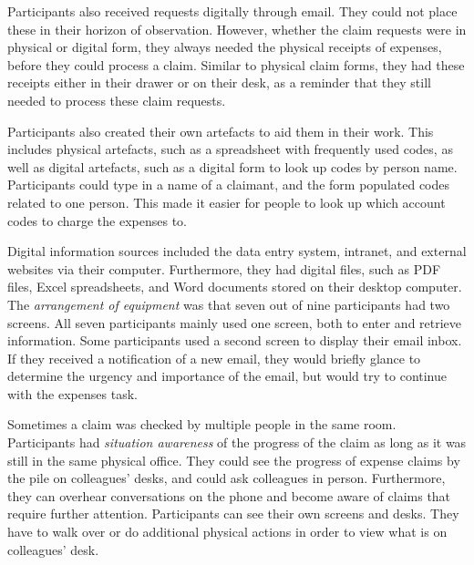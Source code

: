 Participants also received requests digitally through email. They could not place these in their horizon of observation. However, whether the claim requests were in physical or digital form, they always needed the physical receipts of expenses, before they could process a claim. Similar to physical claim forms, they had these receipts either in their drawer or on their desk, as a reminder that they still needed to process these claim requests.

Participants also created their own artefacts to aid them in their work. This includes physical artefacts, such as a spreadsheet with frequently used codes, as well as digital artefacts, such as a digital form to look up codes by person name. Participants could type in a name of a claimant, and the form populated codes related to one person. This made it easier for people to look up which account codes to charge the expenses to. 

Digital information sources included the data entry system, intranet, and external websites via their computer. Furthermore, they had digital files, such as PDF files, Excel spreadsheets, and Word documents stored on their desktop computer. The \textit{arrangement of equipment} was that seven out of nine participants had two screens. All seven participants mainly used one screen, both to enter and retrieve information. Some participants used a second screen to display their email inbox. If they received a notification of a new email, they would briefly glance to determine the urgency and importance of the email, but would try to continue with the expenses task. 

Sometimes a claim was checked by multiple people in the same room. Participants had \textit{situation awareness} of the progress of the claim as long as it was still in the same physical office. They could see the progress of expense claims by the pile on colleagues' desks, and could ask colleagues in person. Furthermore, they can overhear conversations on the phone and become aware of claims that require further attention. Participants can see their own screens and desks. They have to walk over or do additional physical actions in order to view what is on colleagues' desk.  

